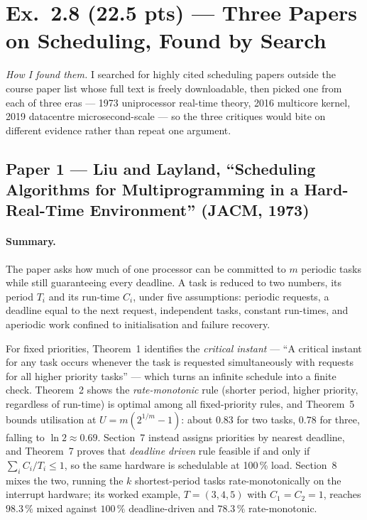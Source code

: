 \section*{Ex.~2.8 (22.5 pts) --- Three Papers on Scheduling, Found by Search}

\emph{How I found them.} I searched for highly cited scheduling papers outside the
course paper list whose full text is freely downloadable, then picked one from each of
three eras --- 1973 uniprocessor real-time theory, 2016 multicore kernel, 2019
datacentre microsecond-scale --- so the three critiques would bite on different
evidence rather than repeat one argument.

\subsection*{Paper 1 --- Liu and Layland, ``Scheduling Algorithms for
Multiprogramming in a Hard-Real-Time Environment'' (JACM, 1973)}

\paragraph{Summary.}
The paper asks how much of one processor can be committed to $m$ periodic tasks while
still guaranteeing every deadline. A task is reduced to two numbers, its period $T_i$
and its run-time $C_i$, under five assumptions: periodic requests, a deadline equal to
the next request, independent tasks, constant run-times, and aperiodic work confined to
initialisation and failure recovery.

For fixed priorities, Theorem~1 identifies the \emph{critical instant} --- ``A critical
instant for any task occurs whenever the task is requested simultaneously with requests
for all higher priority tasks'' --- which turns an infinite schedule into a finite
check. Theorem~2 shows the \emph{rate-monotonic} rule (shorter period, higher priority,
regardless of run-time) is optimal among all fixed-priority rules, and Theorem~5 bounds
utilisation at $U = m\left(2^{1/m}-1\right)$: about $0.83$ for two tasks, $0.78$ for
three, falling to $\ln 2 \approx 0.69$. Section~7 instead assigns priorities by nearest
deadline, and Theorem~7 proves that \emph{deadline driven} rule feasible if and only if
$\sum_i C_i/T_i \le 1$, so the same hardware is schedulable at 100\,\% load. Section~8
mixes the two, running the $k$ shortest-period tasks rate-monotonically on the
interrupt hardware; its worked example, $T = (3,4,5)$ with $C_1 = C_2 = 1$, reaches
$98.3\,\%$ mixed against $100\,\%$ deadline-driven and $78.3\,\%$ rate-monotonic.

